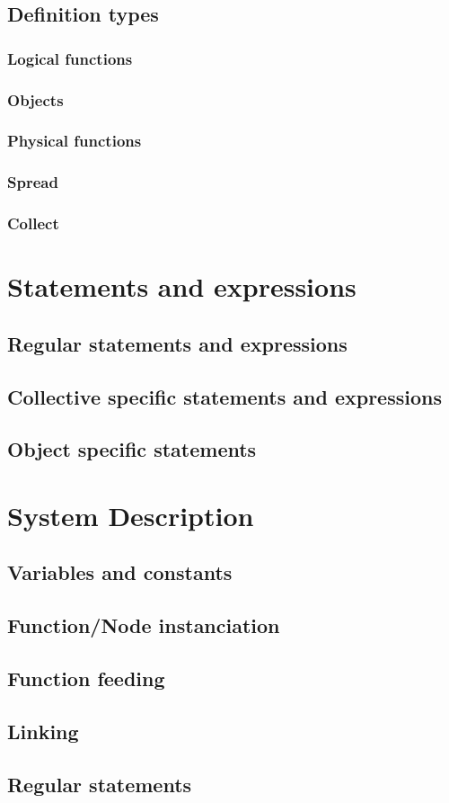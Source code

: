 \documentclass{article}
\begin{document}
\subsection{Definition types}
\subsubsection{Logical functions}
\subsubsection{Objects}
\subsubsection{Physical functions}
\subsubsection{Spread}
\subsubsection{Collect}

\section{Statements and expressions}
\subsection{Regular statements and expressions}
\subsection{Collective specific statements and expressions}
\subsection{Object specific statements}


\section{System Description}
\subsection{Variables and constants}
\subsection{Function/Node instanciation}
\subsection{Function feeding}
\subsection{Linking}
\subsection{Regular statements}
\end{document}
